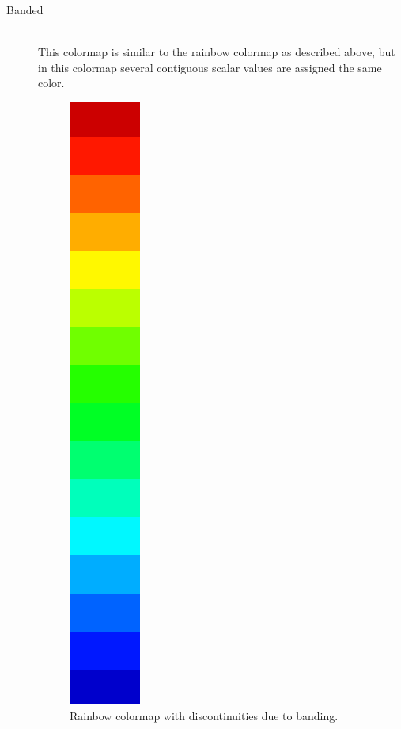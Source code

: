 \begin{description}
			\item[Banded] ~\\
			 This colormap is similar to the rainbow colormap as described above, but in this colormap several contiguous scalar values are assigned the same color.
			\begin{figure}[htb]
				\centering
				\includegraphics[angle=270, width=\linewidth, totalheight=1em, frame]{./content/pictures/rainbow_16.png}
				\caption{Rainbow colormap with discontinuities due to banding.}
			\end{figure}
		\end{description}
		
